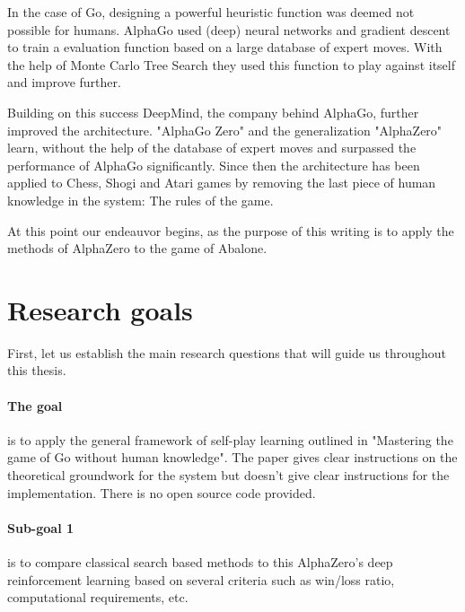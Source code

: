 In the case of Go, designing a powerful heuristic function was deemed not possible for humans. AlphaGo used (deep) neural networks and gradient descent to train a evaluation function based on a large database of expert moves. With the help of Monte Carlo Tree Search they used this function to play against itself and improve further. \cite{silver_mastering_2017}

Building on this success DeepMind, the company behind AlphaGo, further improved the architecture. "AlphaGo Zero" and the generalization "AlphaZero"  learn, without the help of the database of expert moves and surpassed the performance of AlphaGo significantly. Since then the architecture has been applied to Chess, Shogi and Atari games by removing the last piece of human knowledge in the system: The rules of the game. \cite{schrittwieser_mastering_2020}

At this point our endeauvor begins, as the purpose of this writing is to apply the methods of AlphaZero to the game of Abalone.

\section{Research goals}
First, let us establish the main research questions that will guide us throughout this thesis.

\paragraph{The goal} is to apply the general framework of self-play learning outlined in "Mastering the game of Go without human knowledge". \cite{silver_mastering_2017} The paper gives clear instructions on the theoretical groundwork for the system but doesn't give clear instructions for the implementation. There is no open source code provided.

\paragraph{Sub-goal 1} is to compare classical search based methods to this AlphaZero's deep reinforcement learning based on several criteria such as win/loss ratio, computational requirements, etc.